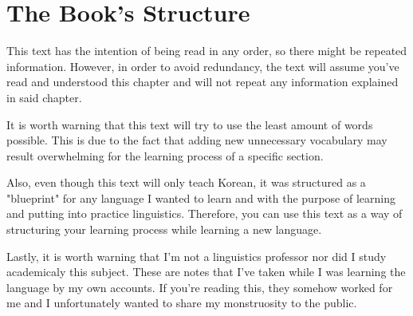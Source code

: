 \section{The Book's Structure}

This text has the intention of being read in any order, so there might be repeated information. However, in order to avoid redundancy, the text will assume you've read and understood this chapter and will not repeat any information explained in said chapter.

It is worth warning that this text will try to use the least amount of words possible. This is due to the fact that adding new unnecessary vocabulary may result overwhelming for the learning process of a specific section. 

Also, even though this text will only teach Korean, it was structured as a "blueprint" for any language I wanted to learn and with the purpose of learning and putting into practice linguistics. Therefore, you can use this text as a way of structuring your learning process while learning a new language.

Lastly, it is worth warning that I'm not a linguistics professor nor did I study academicaly this subject. These are notes that I've taken while I was learning the language by my own accounts. If you're reading this, they somehow worked for me and I unfortunately wanted to share my monstruosity to the public.